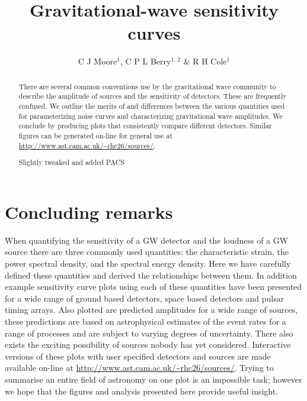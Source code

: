 \documentclass[fleqn,12pt]{iopart}
\newcommand{\cplb}[1]{{\color{red} #1}}
\begin{document}
\title{Gravitational-wave sensitivity curves}
\author{C J Moore$^1$, C P L Berry$^{1,\,2}$ \& R H Cole$^1$}
\address{$^1$ Institute of Astronomy, Madingley Road, Cambridge, CB3 0HA, United Kingdom}
\address{$^2$ School of Physics and Astronomy, University of Birmingham, Edgbaston, Birmingham B15 2TT, United Kingdom}

\begin{abstract}
There are several common conventions use by the gravitational wave community to describe the amplitude of sources and the sensitivity of detectors. These are frequently confused. We outline the merits of and differences between the various quantities used for parameterizing noise curves and characterizing gravitational wave amplitudes. We conclude by producing plots that consistently compare different detectors. Similar figures can be generated on-line for general use at \url{http://www.ast.cam.ac.uk/~rhc26/sources/}.

\cplb{Slightly tweaked and added PACS}
\end{abstract}







\section{Concluding remarks}\label{sec:discussion}
When quantifying the sensitivity of a GW detector and the loudness of a GW source there are three commonly used quantities: the characteristic strain, the power spectral density, and the spectral energy density. Here we have carefully defined these quantities and derived the relationships between them. In addition example sensitivity curve plots using each of these quantities have been presented for a wide range of ground based detectors, space based detectors and pulsar timing arrays. Also plotted are predicted amplitudes for a wide range of sources, these predictions are based on astrophysical estimates of the event rates for a range of processes and are subject to varying degrees of uncertainty. There also exists the exciting possibility of sources nobody has yet considered. Interactive versions of these plots with user specified detectors and sources are made available on-line at \url{http://www.ast.cam.ac.uk/~rhc26/sources/}. Trying to summarise an entire field of astronomy on one plot is an impossible task; however we hope that the figures and analysis presented here provide useful insight.




%


\end{document}
